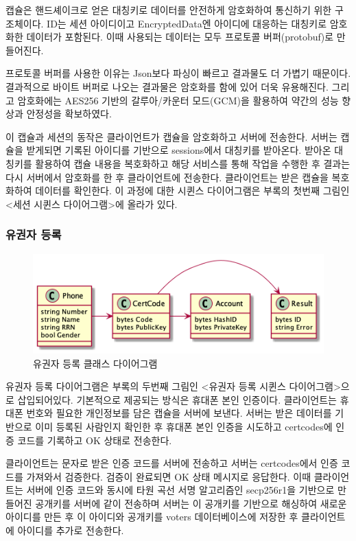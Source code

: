 \documentclass[8pt,a4paper,left=8mm,right=8mm,top=10mm,bottom=10mm]{article}
\begin{document}
    캡슐은 핸드셰이크로 얻은 대칭키로 데이터를 안전하게 암호화하여 통신하기 위한 구조체이다. ID는 세션 아이디이고 EncryptedData엔 아이디에 대응하는 대칭키로 암호화한 데이터가 포함된다. 이때 사용되는 데이터는 모두 프로토콜 버퍼(protobuf)로 만들어진다.

    프로토콜 버퍼를 사용한 이유는 Json보다 파싱이 빠르고 결과물도 더 가볍기 때문이다. 결과적으로 바이트 버퍼로 나오는 결과물은 암호화를 함에 있어 더욱 유용해진다. 그리고 암호화에는 AES256 기반의 갈루아/카운터 모드(GCM)을 활용하여 약간의 성능 향상과 안정성을 확보하였다.

    이 캡슐과 세션의 동작은 클라이언트가 캡슐을 암호화하고 서버에 전송한다. 서버는 캡슐을 받게되면 기록된 아이디를 기반으로 sessions에서 대칭키를 받아온다. 받아온 대칭키를 활용하여 캡슐 내용을 복호화하고 해당 서비스를 통해 작업을 수행한 후 결과는 다시 서버에서 암호화를 한 후 클라이언트에 전송한다. 클라이언트는 받은 캡슐을 복호화하여 데이터를 확인한다. 이 과정에 대한 시퀸스 다이어그램은 부록의 첫번째 그림인 <세션 시퀸스 다이어그램>에 올라가 있다.

    \subsubsection{유권자 등록}

    \begin{figure}[h]
        \begin{center}
            \includegraphics[width=12cm]{client-register-class}
            \caption{유권자 등록 클래스 다이어그램}
        \end{center}
    \end{figure}

    유권자 등록 다이어그램은 부록의 두번째 그림인 <유권자 등록 시퀸스 다이어그램>으로 삽입되어있다. 기본적으로 제공되는 방식은 휴대폰 본인 인증이다. 클라이언트는 휴대폰 번호와 필요한 개인정보를 담은 캡슐을 서버에 보낸다. 서버는 받은 데이터를 기반으로 이미 등록된 사람인지 확인한 후 휴대폰 본인 인증을 시도하고 certcodes에 인증 코드를 기록하고 OK 상태로 전송한다.

    클라이언트는 문자로 받은 인증 코드를 서버에 전송하고 서버는 certcodes에서 인증 코드를 가져와서 검증한다. 검증이 완료되면 OK 상태 메시지로 응답한다. 이때 클라이언트는 서버에 인증 코드와 동시에 타원 곡선 서명 알고리즘인 secp256r1을 기반으로 만들어진 공개키를 서버에 같이 전송하며 서버는 이 공개키를 기반으로 해싱하여 새로운 아이디를 만든 후 이 아이디와 공개키를 voters 데이터베이스에 저장한 후 클라이언트에 아이디를 추가로 전송한다.
\end{document}
